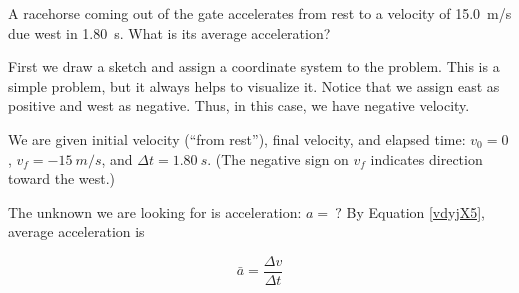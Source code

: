 \documentclass[../../main-ap-physics.tex]{subfiles}
\begin{document}
\begin{example}
    A racehorse coming out of the gate accelerates from rest to a velocity of \SI{15.0}{m/s} due west in \SI{1.80}{s}. What is its average acceleration?
\end{example}

\Solution First we draw a sketch and assign a coordinate system to the problem. This is a simple problem, but it always helps to visualize it. Notice that we assign east as positive and west as negative. Thus, in this case, we have negative velocity.

\begin{center}
\end{center}

We are given initial velocity (``from rest''), final velocity, and elapsed time: $v_0 = 0$, $v_f = -\SI{15}{m/s}$, and $\Delta{t} = \SI{1.80}{s}$. (The negative sign on $v_f$ indicates direction toward the west.)

\vspace{1em}

The unknown we are looking for is acceleration: $a =\ ?$ By Equation \eqref{vdyjX5}, average acceleration is

\begin{equation*}
    \bar{a} = \frac{\Delta{v}}{\Delta{t}}
\end{equation*}
\end{document}
